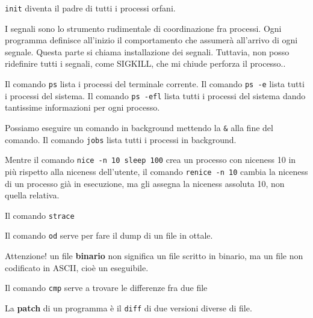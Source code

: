 \documentclass[a4paper,10pt]{article} %
\renewcommand{\b}[1]{%
    {\textbf{#1}}}
\renewcommand{\t}[1]{%
    {\texttt{#1}}}
\begin{document}
\t{init} diventa il padre di tutti i processi orfani.

I segnali sono lo strumento rudimentale di coordinazione fra processi. Ogni programma definisce all'inizio il comportamento che assumerà all'arrivo di ogni segnale. Questa parte si chiama installazione dei segnali. Tuttavia, non posso ridefinire tutti i segnali, come SIGKILL, che mi chiude perforza il processo..

Il comando \t{ps} lista i processi del terminale corrente. Il comando \t{ps -e} lista tutti i processi del sistema. Il comando \t{ps -efl} lista tutti i processi del sistema dando tantissime informazioni per ogni processo.

Possiamo eseguire un comando in background mettendo la \t{\&} alla fine del comando. Il comando \t{jobs} lista tutti i processi in background.

Mentre il comando \t{nice -n 10 sleep 100} crea un processo con niceness 10 in più rispetto alla niceness dell'utente, il comando \t{renice -n 10} cambia la niceness di un processo già in esecuzione, ma gli assegna la niceness assoluta 10, non quella relativa.

Il comando \t{strace}

Il comando \t{od} serve per fare il dump di un file in ottale.

Attenzione! un file \b{binario} non significa un file scritto in binario, ma un file non codificato in ASCII, cioè un eseguibile.

Il comando \t{cmp} serve a trovare le differenze fra due file

La \b{patch} di un programma è il \t{diff} di due versioni diverse di file.
\end{document}

